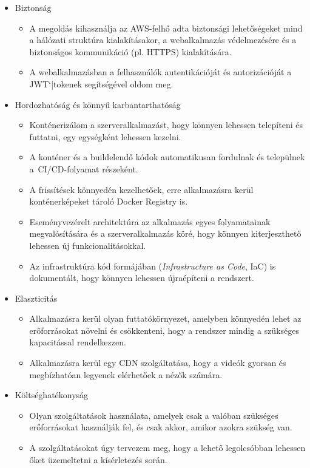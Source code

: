 \begin{itemize}
  \item Biztonság
  \begin{itemize}
    \item A megoldás kihasználja az AWS-felhő adta biztonsági lehetőségeket mind a hálózati struktúra kialakításakor, a webalkalmazás védelmezésére és a biztonságos kommunikáció (pl. HTTPS) kialakítására.
    \item A webalkalmazásban a felhasználók autentikációját és autorizációját a JWT`|tokenek segítségével oldom meg.
  \end{itemize}
  \item Hordozhatóság és könnyű karbantarthatóság
   \begin{itemize}
    \item Konténerizálom a szerveralkalmazást, hogy könnyen lehessen telepíteni és futtatni, egy egységként lehessen kezelni.
    \item A konténer és a buildelendő kódok automatikusan fordulnak és települnek a~CI/CD-folyamat részeként.
    \item A frissítések könnyedén kezelhetőek, erre alkalmazásra kerül konténerképeket tároló Docker Registry is.
    \item Eseményvezérelt architektúra az alkalmazás egyes folyamatainak megvalósítására és a szerveralkalmazás köré, hogy könnyen kiterjeszthető lehessen új funkcionalitásokkal.
    \item Az infrastruktúra kód formájában (\emph{Infrastructure as Code}, IaC) is dokumentált, hogy könnyen lehessen újraépíteni a rendszert.
  \end{itemize}
  \item Elaszticitás
  \begin{itemize}
    \item Alkalmazásra kerül olyan futtatókörnyezet, amelyben könnyedén lehet az erőforrásokat növelni és csökkenteni, hogy a rendszer mindig a szükséges kapacitással rendelkezzen.
    \item Alkalmazásra kerül egy CDN szolgáltatása, hogy a videók gyorsan és megbízhatóan legyenek elérhetőek a nézők számára.
  \end{itemize}
  \item Költséghatékonyság
  \begin{itemize}
    \item Olyan szolgáltatások használata, amelyek csak a valóban szükséges erőforrásokat használják fel, és csak akkor, amikor azokra szükség van.
    \item A szolgáltatásokat úgy tervezem meg, hogy a lehető legolcsóbban lehessen őket üzemeltetni a kísérletezés során.
  \end{itemize}
\end{itemize}
